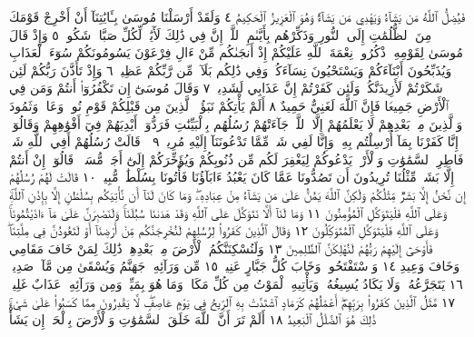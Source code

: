 فَيُضِلُّ ٱللَّهُ مَن يَشَآءُ وَيَهْدِي مَن يَشَآءُۚ وَهُوَ ٱلْعَزِيزُ
ٱلْحَكِيمُ ٤ وَلَقَدْ أَرْسَلْنَا مُوسَىٰ بِـَٔايَٰتِنَآ أَنْ أَخْرِجْ
قَوْمَكَ مِنَ ٱلظُّلُمَٰتِ إِلَى ٱلنُّورِ وَذَكِّرْهُم بِأَيَّىٰمِ
ٱللَّهِۚ إِنَّ فِي ذَٰلِكَ لَأٓيَٰتࣲ لِّكُلِّ صَبَّارࣲ شَكُورࣲ ٥
وَإِذْ قَالَ مُوسَىٰ لِقَوْمِهِ ٱذْكُرُوا۟ نِعْمَةَ ٱللَّهِ عَلَيْكُمْ
إِذْ أَنجَىٰكُم مِّنْ ءَالِ فِرْعَوْنَ يَسُومُونَكُمْ سُوٓءَ ٱلْعَذَابِ
وَيُذَبِّحُونَ أَبْنَآءَكُمْ وَيَسْتَحْيُونَ نِسَآءَكُمْۚ وَفِي
ذَٰلِكُم بَلَآءࣱ مِّن رَّبِّكُمْ عَظِيمࣱ ٦ وَإِذْ تَأَذَّنَ رَبُّكُمْ
لَئِن شَكَرْتُمْ لَأَزِيدَنَّكُمْۖ وَلَئِن كَفَرْتُمْ إِنَّ عَذَابِي
لَشَدِيدࣱ ٧ وَقَالَ مُوسَىٰٓ إِن تَكْفُرُوٓا۟ أَنتُمْ وَمَن فِي
ٱلْأَرْضِ جَمِيعࣰا فَإِنَّ ٱللَّهَ لَغَنِيٌّ حَمِيدٌ ٨ أَلَمْ يَأْتِكُمْ نَبَؤُا۟
ٱلَّذِينَ مِن قَبْلِكُمْ قَوْمِ نُوحࣲ وَعَادࣲ وَثَمُودَ وَٱلَّذِينَ
مِنۢ بَعْدِهِمْ لَا يَعْلَمُهُمْ إِلَّا ٱللَّهُۚ جَآءَتْهُمْ رُسُلُهُم
بِٱلْبَيِّنَٰتِ فَرَدُّوٓا۟ أَيْدِيَهُمْ فِيٓ أَفْوَٰهِهِمْ وَقَالُوٓا۟ إِنَّا كَفَرْنَا
بِمَآ أُرْسِلْتُم بِهِۦ وَإِنَّا لَفِي شَكࣲّ مِّمَّا تَدْعُونَنَآ إِلَيْهِ مُرِيبࣲ ٩
۞ قَالَتْ رُسُلُهُمْ أَفِي ٱللَّهِ شَكࣱّ فَاطِرِ ٱلسَّمَٰوَٰتِ وَٱلْأَرْضِۖ
يَدْعُوكُمْ لِيَغْفِرَ لَكُم مِّن ذُنُوبِكُمْ وَيُؤَخِّرَكُمْ إِلَىٰٓ أَجَلࣲ
مُّسَمࣰّىۚ قَالُوٓا۟ إِنْ أَنتُمْ إِلَّا بَشَرࣱ مِّثْلُنَا تُرِيدُونَ أَن تَصُدُّونَا
عَمَّا كَانَ يَعْبُدُ ءَابَآؤُنَا فَأْتُونَا بِسُلْطَٰنࣲ مُّبِينࣲ ١٠
قَالَتْ لَهُمْ رُسُلُهُمْ إِن نَّحْنُ إِلَّا بَشَرࣱ مِّثْلُكُمْ وَلَٰكِنَّ ٱللَّهَ
يَمُنُّ عَلَىٰ مَن يَشَآءُ مِنْ عِبَادِهِۦۖ وَمَا كَانَ لَنَآ أَن نَّأْتِيَكُم
بِسُلْطَٰنٍ إِلَّا بِإِذْنِ ٱللَّهِۚ وَعَلَى ٱللَّهِ فَلْيَتَوَكَّلِ ٱلْمُؤْمِنُونَ ١١
وَمَا لَنَآ أَلَّا نَتَوَكَّلَ عَلَى ٱللَّهِ وَقَدْ هَدَىٰنَا سُبُلَنَاۚ وَلَنَصْبِرَنَّ
عَلَىٰ مَآ ءَاذَيْتُمُونَاۚ وَعَلَى ٱللَّهِ فَلْيَتَوَكَّلِ ٱلْمُتَوَكِّلُونَ ١٢
وَقَالَ ٱلَّذِينَ كَفَرُوا۟ لِرُسُلِهِمْ لَنُخْرِجَنَّكُم مِّنْ أَرْضِنَآ
أَوْ لَتَعُودُنَّ فِي مِلَّتِنَاۖ فَأَوْحَىٰٓ إِلَيْهِمْ رَبُّهُمْ لَنُهْلِكَنَّ
ٱلظَّٰلِمِينَ ١٣ وَلَنُسْكِنَنَّكُمُ ٱلْأَرْضَ مِنۢ بَعْدِهِمْۚ
ذَٰلِكَ لِمَنْ خَافَ مَقَامِي وَخَافَ وَعِيدِ ١٤ وَٱسْتَفْتَحُوا۟
وَخَابَ كُلُّ جَبَّارٍ عَنِيدࣲ ١٥ مِّن وَرَآئِهِۦ جَهَنَّمُ وَيُسْقَىٰ
مِن مَّآءࣲ صَدِيدࣲ ١٦ يَتَجَرَّعُهُۥ وَلَا يَكَادُ يُسِيغُهُۥ وَيَأْتِيهِ
ٱلْمَوْتُ مِن كُلِّ مَكَانࣲ وَمَا هُوَ بِمَيِّتࣲۖ وَمِن وَرَآئِهِۦ
عَذَابٌ غَلِيظࣱ ١٧ مَّثَلُ ٱلَّذِينَ كَفَرُوا۟ بِرَبِّهِمْۖ أَعْمَٰلُهُمْ
كَرَمَادٍ ٱشْتَدَّتْ بِهِ ٱلرِّيحُ فِي يَوْمٍ عَاصِفࣲۖ لَّا يَقْدِرُونَ
مِمَّا كَسَبُوا۟ عَلَىٰ شَيْءࣲۚ ذَٰلِكَ هُوَ ٱلضَّلَٰلُ ٱلْبَعِيدُ ١٨
أَلَمْ تَرَ أَنَّ ٱللَّهَ خَلَقَ ٱلسَّمَٰوَٰتِ وَٱلْأَرْضَ بِٱلْحَقِّۚ إِن يَشَأْ
